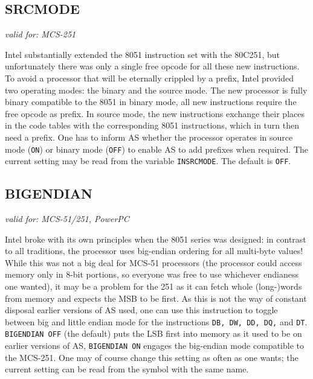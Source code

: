 \documentclass[12pt,twoside]{report}
\makeatletter
\newcommand{\tty}[1]{{\tt #1}}
\newcommand{\ttindex}[1]{\index{#1@{\tt #1}}}
\makeatother
\begin{document}

\subsection{SRCMODE}
\ttindex{SRCMDE}

{\em valid for: MCS-251}

Intel substantially extended the 8051 instruction set with the 80C251, but
unfortunately there was only a single free opcode for all these new
instructions.  To avoid a processor that will be eternally crippled by a
prefix, Intel provided two operating modes: the binary and the source
mode.  The new processor is fully binary compatible to the 8051 in binary
mode, all new instructions require the free opcode as prefix.  In source
mode, the new instructions exchange their places in the code tables with
the corresponding 8051 instructions, which in turn then need a prefix.
One has to inform AS whether the processor operates in source mode
(\tty{ON}) or binary mode (\tty{OFF}) to enable AS to add prefixes when
required.  The current setting may be read from the variable
\tty{INSRCMODE}.  The default is \tty{OFF}.


\subsection{BIGENDIAN}
\ttindex{BIGENDIAN}

{\em valid for: MCS-51/251, PowerPC}

Intel broke with its own principles when the 8051 series was designed: in
contrast to all traditions, the processor uses big-endian ordering for all
multi-byte values!  While this was not a big deal for MCS-51 processors
(the processor could access memory only in 8-bit portions, so everyone was
free to use whichever endianess one wanted), it may be a problem for the
251 as it can fetch whole (long-)words from memory and expects the MSB to
be first.  As this is not the way of constant disposal earlier versions of
AS used, one can use this instruction to toggle between big and
little endian mode for the instructions \tty{DB, DW, DD, DQ,} and
\tty{DT}.  \tty{BIGENDIAN OFF} (the default) puts the LSB first into
memory as it used to be on earlier versions of AS, \tty{BIGENDIAN ON}
engages the big-endian mode compatible to the MCS-251.  One may of course
change this setting as often as one wants; the current setting can be read
from the symbol with the same name.
\end{document}
